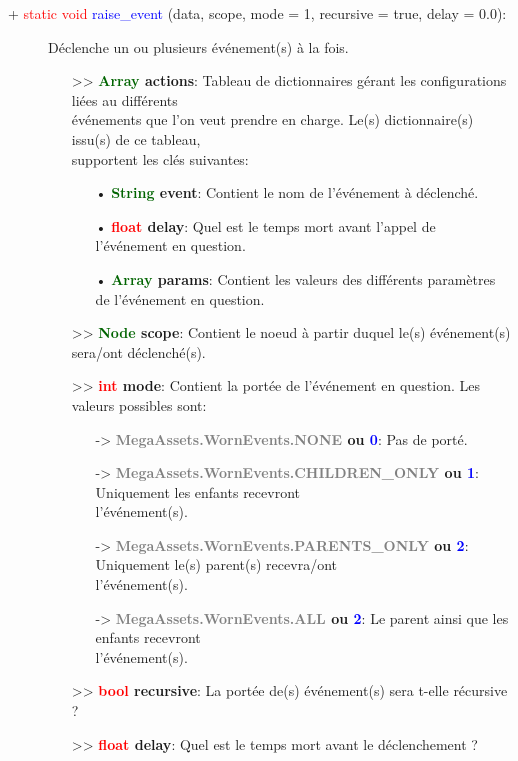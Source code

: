 \documentclass[a4paper, 11pt]{article}
\begin{document}
	\begin{description}
		\item [+ \textcolor{red}{static void} \textcolor{blue}{raise\_event} (data, scope, mode = 1,
		recursive = true, delay = 0.0):] Déclenche un ou plusieurs événement(s) à la fois.
		\begin{itemize}
			\item[>> \textbf{\textcolor{darkgreen}{Array} actions}:] Tableau de dictionnaires gérant les
			configurations liées au différents \\événements que l'on veut prendre en charge. Le(s)
			dictionnaire(s) issu(s) de ce tableau, \\supportent les clés suivantes:
		    \begin{itemize}
			    \item[• \textbf{\textcolor{darkgreen}{String} event}:] Contient le nom de l'événement à
			    déclenché.
			    \item[• \textbf{\textcolor{red}{float} delay}:] Quel est le temps mort avant l'appel de
			    l'événement en question.
			    \item[• \textbf{\textcolor{darkgreen}{Array} params}:] Contient les valeurs des différents 
			    paramètres de l'événement en question.
			\end{itemize}
			\item [>> \textbf{\textcolor{darkgreen}{Node} scope}:] Contient le noeud à partir duquel le(s)
			événement(s) sera/ont déclenché(s).
			\item [>> \textbf{\textcolor{red}{int} mode}:] Contient la portée de l'événement en question. 
			Les valeurs possibles sont:
			\begin{itemize}
				\item [-> \textbf{\textcolor{gray}{MegaAssets.WornEvents.NONE} ou \textcolor{blue}{0}}:] 
				Pas de porté.
				\item [-> \textbf{\textcolor{gray}{MegaAssets.WornEvents.CHILDREN\_ONLY} ou 
				\textcolor{blue}{1}}:] Uniquement les enfants recevront \\l'événement(s).
				\item [-> \textbf{\textcolor{gray}{MegaAssets.WornEvents.PARENTS\_ONLY} ou \textcolor{blue}
				{2}}:] Uniquement le(s) parent(s) recevra/ont \\l'événement(s).
				\item [-> \textbf{\textcolor{gray}{MegaAssets.WornEvents.ALL} ou \textcolor{blue}{2}}:] Le 
				parent ainsi que les enfants recevront \\l'événement(s).
			\end{itemize}
			\item [>> \textbf{\textcolor{red}{bool} recursive}:] La portée de(s) événement(s) sera t-elle
			récursive ?
			\item [>> \textbf{\textcolor{red}{float} delay}:] Quel est le temps mort avant le déclenchement 
			?\\
		\end{itemize}
	\end{description}
\end{document}
